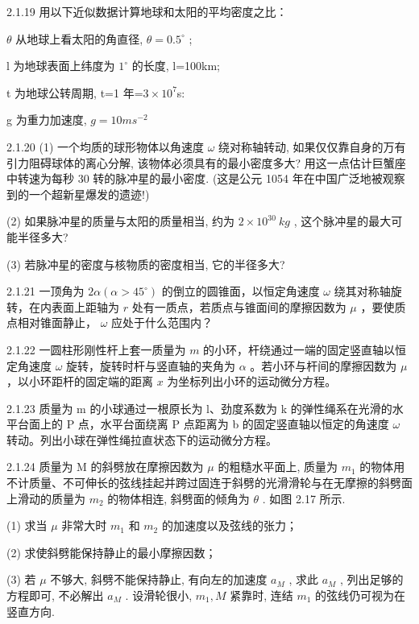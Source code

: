 \begin{problem}{2.1.19}
用以下近似数据计算地球和太阳的平均密度之比：

$\theta$ 从地球上看太阳的角直径, $\theta=0.5^{\circ}$ ;

l 为地球表面上纬度为 $1^{\circ}$ 的长度, l=100km;

t 为地球公转周期, t=1 年=$3\times 10^{7}$s:

g 为重力加速度, $g=10ms^{-2}$
\end{problem}
\clearpage


\begin{problem}{2.1.20}
(1) 一个均质的球形物体以角速度 $\omega$ 绕对称轴转动, 如果仅仅靠自身的万有引力阻碍球体的离心分解, 该物体必须具有的最小密度多大? 用这一点估计巨蟹座中转速为每秒 30 转的脉冲星的最小密度. (这是公元 1054 年在中国广泛地被观察到的一个超新星爆发的遗迹!)

(2) 如果脉冲星的质量与太阳的质量相当, 约为 $2 \times 10^{30} ~kg$ , 这个脉冲星的最大可能半径多大?

(3) 若脉冲星的密度与核物质的密度相当, 它的半径多大?
\end{problem}
\clearpage


\begin{problem}{2.1.21}
一顶角为 $2\alpha (\alpha > 45^{\circ})$ 的倒立的圆锥面，以恒定角速度 $\omega$ 绕其对称轴旋转，在内表面上距轴为 $r$ 处有一质点，若质点与锥面间的摩擦因数为 $\mu$ ，要使质点相对锥面静止， $\omega$ 应处于什么范围内？
\end{problem}
\clearpage


\begin{problem}{2.1.22}
一圆柱形刚性杆上套一质量为 $m$ 的小环，杆绕通过一端的固定竖直轴以恒定角速度 $\omega$ 旋转，旋转时杆与竖直轴的夹角为 $\alpha$ 。若小环与杆间的摩擦因数为 $\mu$ ，以小环距杆的固定端的距离 $x$ 为坐标列出小环的运动微分方程。
\end{problem}
\clearpage


\begin{problem}{2.1.23}
质量为 m 的小球通过一根原长为 l、劲度系数为 k 的弹性绳系在光滑的水平台面上的 P 点，水平台面绕离 P 点距离为 b 的固定竖直轴以恒定的角速度 $\omega$ 转动。列出小球在弹性绳拉直状态下的运动微分方程。
\end{problem}
\clearpage


\begin{problem}{2.1.24}
质量为 M 的斜劈放在摩擦因数为 $\mu$ 的粗糙水平面上, 质量为 $m_{1}$ 的物体用不计质量、不可伸长的弦线挂起并跨过固连于斜劈的光滑滑轮与在无摩擦的斜劈面上滑动的质量为 $m_{2}$ 的物体相连, 斜劈面的倾角为 $\theta$ . 如图 2.17 所示.

(1) 求当 $\mu$ 非常大时 $m_{1}$ 和 $m_{2}$ 的加速度以及弦线的张力；

(2) 求使斜劈能保持静止的最小摩擦因数；

(3) 若 $\mu$ 不够大, 斜劈不能保持静止, 有向左的加速度 $a_{M}$ , 求此 $a_{M}$ , 列出足够的方程即可, 不必解出 $a_{M}$ . 设滑轮很小, $m_{1}, M$ 紧靠时, 连结 $m_{1}$ 的弦线仍可视为在竖直方向.
\begin{center}

\end{center}
\end{problem}
\clearpage


